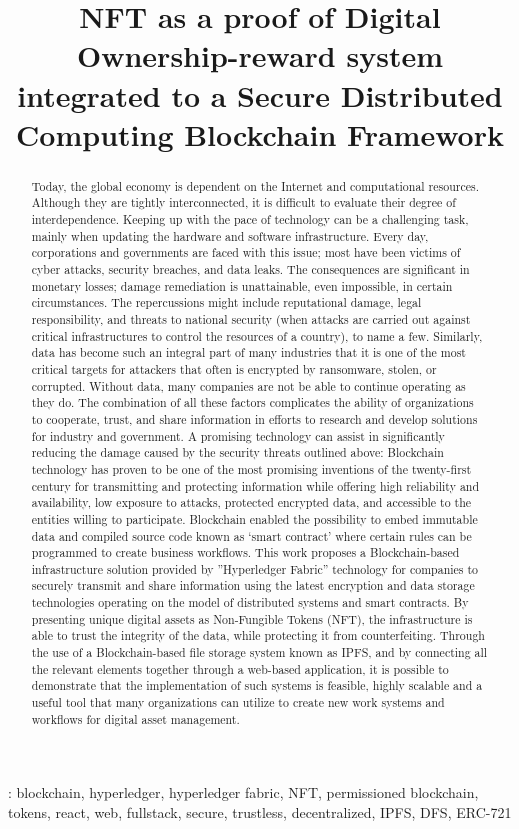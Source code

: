 \documentclass[a4paper]{article}
\title{NFT as a proof of Digital
Ownership-reward system integrated to a
Secure Distributed Computing Blockchain
Framework}
\begin{document}
\maketitle
%
\begin{abstract}
Today, the global economy is dependent on the Internet and computational resources. Although they are tightly interconnected, it is difficult to evaluate their
degree of interdependence. Keeping up with the pace of technology can be a challenging task, mainly when updating the hardware and software infrastructure. Every day, corporations and governments are faced with this issue; most have been
victims of cyber attacks, security breaches, and data leaks. The consequences are
significant in monetary losses; damage remediation is unattainable, even impossible, in certain circumstances. The repercussions might include reputational damage, legal responsibility, and threats to national security (when attacks are carried
out against critical infrastructures to control the resources of a country), to name a
few. Similarly, data has become such an integral part of many industries that it is
one of the most critical targets for attackers that often is encrypted by ransomware,
stolen, or corrupted. Without data, many companies are not be able to continue
operating as they do. The combination of all these factors complicates the ability
of organizations to cooperate, trust, and share information in efforts to research
and develop solutions for industry and government.
A promising technology can assist in significantly reducing the damage caused
by the security threats outlined above: Blockchain technology has proven to be one
of the most promising inventions of the twenty-first century for transmitting and
protecting information while offering high reliability and availability, low exposure
to attacks, protected encrypted data, and accessible to the entities willing to participate. Blockchain enabled the possibility to embed immutable data and compiled
source code known as ‘smart contract’ where certain rules can be programmed to
create business workflows.
This work proposes a Blockchain-based infrastructure solution provided by ”Hyperledger Fabric” technology for companies to securely transmit and
share information using the latest encryption and data storage technologies operating on the model of distributed systems and smart contracts. By presenting
unique digital assets as Non-Fungible Tokens (NFT), the infrastructure is able to
trust the integrity of the data, while protecting it from counterfeiting. Through the
use of a Blockchain-based file storage system known as IPFS, and by connecting all
the relevant elements together through a web-based application, it is possible to
demonstrate that the implementation of such systems is feasible, highly scalable
and a useful tool that many organizations can utilize to create new work systems
and workflows for digital asset management.
 \end{abstract}
: blockchain, hyperledger, hyperledger fabric, NFT, permissioned blockchain, tokens, react, web, fullstack, secure, trustless, decentralized, IPFS, DFS, ERC-721
\end{document}
